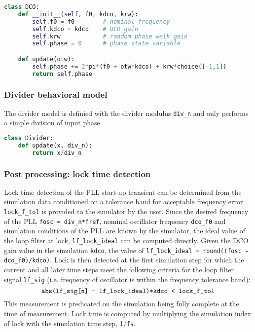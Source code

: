 \begin{lstlisting}[language={Python}, caption={DCO behavioral model.}, label={dco_code}]
class DCO:
	def __init__(self, f0, kdco, krw):
		self.f0 = f0		# nominal frequency
		self.kdco = kdco 	# DCO gain
		self.krw			# random phase walk gain
		self.phase = 0		# phase state variable

	def update(otw):
		self.phase += 2*pi*(f0 + otw*kdco) + krw*choice([-1,1])
		return self.phase
   \end{lstlisting}

\subsubsection{Divider behavioral model}
The divider model is definied with the divider modulus \texttt{div\_n} and only performs a simple division of input phase. 
\begin{lstlisting}[language={Python}, caption={Divider behavioral model.}, label={div_code}]
class Divider:
	def update(x, div_n):
		return x/div_n
\end{lstlisting}

\subsubsection{Post processing: lock time detection}
Lock time detection of the PLL start-up transient can be determined from the simulation data conditioned on a tolerance band for acceptable frequency error \texttt{lock\_f\_tol} is provided to the simulator by the user. Since the desired frequency of the PLL \texttt{fosc = div\_n*fref}, nominal oscillator frequency \texttt{dco\_f0} and simulation conditions of the PLL are known by the simulator, the ideal value of the loop filter at lock, \texttt{lf\_lock\_ideal} can be computed directly. Given the DCO gain value in the simulation \texttt{kdco}, the value of \texttt{lf\_lock\_ideal = round((fosc - dco\_f0)/kdco)}. Lock is then detected at the first simulation step for which the current and all later time steps meet the following criteria for the loop filter signal \texttt{lf\_sig} (i.e. frequency of oscillator is within the frequency tolerance band):
\begin{equation}
\text{\texttt{abs(lf\_sig[n] - lf\_lock\_ideal)*kdco < lock\_f\_tol}}
\end{equation}
This measurement is predicated on the simulation being fully complete at the time of measurement. Lock time is computed by multiplying the simulation index of lock with the simulation time step, 1/\texttt{fs}.

